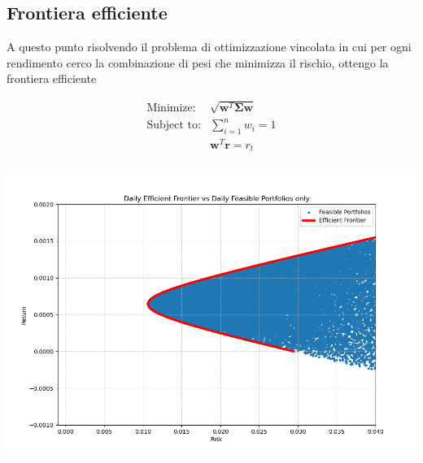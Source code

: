 \documentclass[compress]{beamer}
\begin{document}
\begin{frame}{\subsecname}
\begin{center}
\begin{minipage}{0.5\textwidth}
		\end{minipage}
	\end{center}
\end{frame}

\subsection{Frontiera efficiente}
\begin{frame}{\subsecname}
	A questo punto risolvendo il problema di ottimizzazione vincolata in cui per ogni rendimento cerco la combinazione di pesi che minimizza il rischio, ottengo la frontiera efficiente
	
	\begin{minipage}{0.29\textwidth}
		\[
		\begin{array}{ll}
			\text{Minimize:} & \sqrt{\mathbf{w}^T \mathbf{\Sigma} \mathbf{w}} \\
			\text{Subject to:} & \sum_{i=1}^{n} w_i = 1 \\
			& \mathbf{w}^T \mathbf{r} = r_t \\
			\end{array}
		\]
	\end{minipage}
	\hfill
	\begin{minipage}{0.62\textwidth}
		\centering
		\includegraphics[width=1\linewidth]{images/Daily Efficient Frontier vs Daily Feasible Portfolios only.png}
	\end{minipage}
\end{frame}
\end{document}
